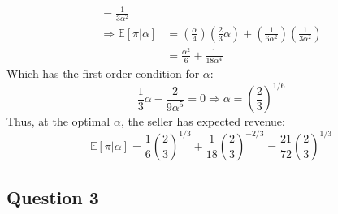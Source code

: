 \documentclass{article}
\newcommand{\E}[1]{\mathbb{E}\left[#1\right]} %
\begin{document}
\begin{itemize}
\begin{align*}
															= \frac{1}{3\alpha^2}											\\
								\Rightarrow\E{\pi|\alpha}	&= \left(\frac{\alpha}{4}\right)\left(\frac{2}{3}\alpha\right)
										+\left(\frac{1}{6\alpha^2}\right)\left(\frac{1}{3\alpha^2}\right)	\\
															&= \frac{\alpha^2}{6} + \frac{1}{18\alpha^4}
	\end{align*}
	Which has the first order condition for $\alpha$:
	\[
		\frac{1}{3}\alpha - \frac{2}{9\alpha^5} = 0	\Rightarrow \alpha = \left(\frac{2}{3}\right)^{1/6}
	\]
	Thus, at the optimal $\alpha$, the seller has expected revenue:
	\[
		\E{\pi|\alpha} = \frac{1}{6}\left(\frac{2}{3}\right)^{1/3} + \frac{1}{18}\left(\frac{2}{3}\right)^{-2/3} = \frac{21}{72}\left(\frac{2}{3}\right)^{1/3}
	\]


\end{itemize}



\subsection*{Question 3}
\end{document}
